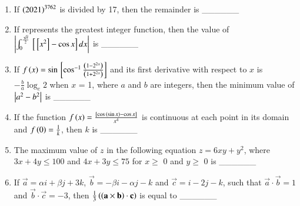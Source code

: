 \documentclass[journal]{IEEEtran}
\begin{document}
\begin{enumerate}
\item If $\left(2021\right)^{3762}$ is divided by 17, then the remainder is \_\_\_\_\_\_ \\
\item If \sbrak{\cdot} represents the greatest integer function, then the value of $\left\vert\int_{0}^{\frac{\sqrt\pi}{2}}{}\left[{}\left[x^2\right] - \cos{x}\right]dx\right\vert$ is \_\_\_\_\_\_ \\
\item If $f\left(x\right) = \sin{}\left[\cos^{-1}\frac{\left(1-2^{2x}\right)}{\left(1+2^{2x}\right)}\right]$ and its first derivative with respect to $x$ is $-\frac{b}{a}\log_{e}{2}$ when $x$ = 1, where $a$ and $b$ are integers, then the minimum value of $\left\vert a^2 - b^2\right\vert$ is \_\_\_\_\_\_ \\
\item If the function $f\left(x\right) = \frac{{}\left[\cos{\ensuremath{\left(\sin{x}\right)}} - \cos{x}\right]}{x^4}$ is continuous at each point in its domain and $f\left(0\right) = \frac{1}{k}$, then $k$ is \_\_\_\_\_\_ \\
\item The maximum value of $z$ in the following equation $z = 6xy + y^2$, where $3x + 4y \leq 100$ and $4x + 3y \leq 75$ for $x \geq$ 0 and $y \geq$ 0 is \_\_\_\_\_\_ \\
\item If $\vec{a} = \alpha i + \beta j + 3k$, $\vec{b} = -\beta i - \alpha j - k$ and $\vec{c} = i -2j - k$, such that $\vec{a}\cdot\vec{b} = 1$ and $\vec{b}\cdot\vec{c} = -3$, then $\frac{1}{3}\left(\left(\mathbf{a}\times\mathbf{b}\right)\cdot\mathbf{c}\right)$ is equal to \_\_\_\_\_\_ \\
\end{enumerate}
\end{document}

